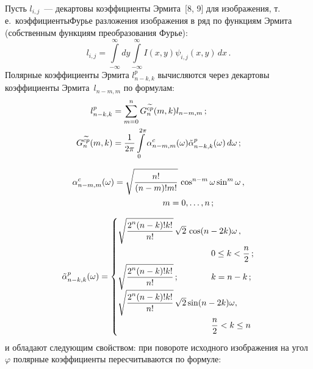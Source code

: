\begin{multicols}{2}
Пусть $l_{i,j}$~--- декартовы коэффициенты Эрмита~[8, 9] для изображения, т.\,е.\ 
коэффициенты\linebreak Фурье разложения изображения в ряд по функциям Эрмита 
(собственным функциям преобразования Фурье):
$$
l_{i,j}=\int\limits_{-\infty}^\infty dy \int\limits_{-\infty}^\infty 
I(x,y)\psi_{i,j}(x,y)\,dx\,.
$$
Полярные коэффициенты Эрмита $l^p_{n-k,k}$ вы\-чис\-ля\-ют\-ся через декартовы 
коэффициенты Эрмита~$l_{n-m,m}$ по формулам:
\begin{align*}
l^p_{n-k,k} &=\sum\limits_{m=0}^n G_n^{\widetilde{cp}}(m,k) l_{n-m,m}\,;\\
G_n^{\widetilde{cp}} (m,k) &=\displaystyle\frac{\displaystyle 1\mathstrut}{\displaystyle 2\pi\mathstrut}\int\limits_0^{2\pi} \alpha^c_{n-m,m}
(\omega) \tilde{\alpha}_{n-k,k}^p (\omega)\,d\omega\,;
\end{align*}

\noindent
\begin{align*}
\alpha^c_{n-m,m}(\omega)&=\sqrt{\fr{n!}{(n-m)!m!}}\,\cos^{n-m}\omega\sin^m\omega\,,\\
&\hspace*{20mm} m=0, \ldots ,n\,;
\end{align*}

\noindent
$$
\tilde{\alpha}^p_{n-k,k}(\omega) =
\begin{cases}
\sqrt{\fr{2^n(n-k)!k!}{n!}}\,\sqrt{2}\,\cos(n-2k)\omega\,, &\\
& \hspace*{-45pt}0\leq k<\fr{n}{2}\,;\\
\sqrt{\fr{2^n(n-k)!k!}{n!}}\,; &\hspace*{-45pt} k=n-k\,;\\
\sqrt{\fr{2^n(n-k)!k!}{n!}}\,\sqrt{2}\sin(n-2k)\omega, &\\
& \hspace*{-45pt}\fr{n}{2}<k\leq n
\end{cases}
$$
и обладают следующим свойством: при повороте исходного изображения на 
угол~$\varphi$ полярные коэффициенты пересчитываются по формуле:


\end{multicols}
